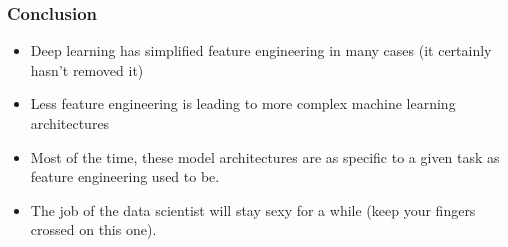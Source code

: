 \begin{frame}[fragile]\frametitle{Conclusion}
	\begin{itemize}
	\item Deep learning has simplified feature engineering in many cases (it certainly hasn't removed it) 
	\item Less feature engineering is leading to more complex machine learning architectures 
	\item Most of the time, these model architectures are as specific to a given task as feature engineering used to be.
	\item The job of the data scientist will stay sexy for a while (keep your fingers crossed on this one).
	\end{itemize}

\end{frame}

